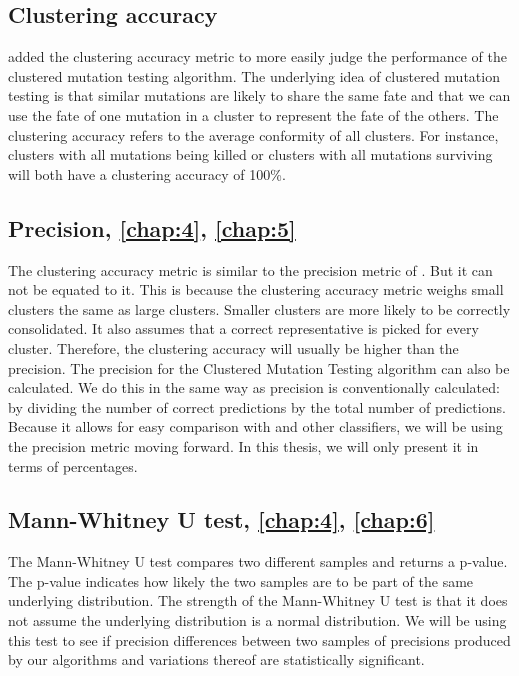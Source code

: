 \documentclass[twoside]{uva-inf-bachelor-thesis}
\begin{document}
\subsection{Clustering accuracy}
\textcite{Mouissie22} added the clustering accuracy metric to more easily judge the performance of the clustered mutation testing algorithm. The underlying idea of clustered mutation testing is that similar mutations are likely to share the same fate and that we can use the fate of one mutation in a cluster to represent the fate of the others. The clustering accuracy refers to the average conformity of all clusters. For instance, clusters with all mutations being killed or clusters with all mutations surviving will both have a clustering accuracy of 100\%.

\subsection{Precision, \textbf{\cref{chap:4}, \cref{chap:5}}}
The clustering accuracy metric is similar to the precision metric of \textcite{Zhang16}. But it can not be equated to it. This is because the clustering accuracy metric weighs small clusters the same as large clusters. Smaller clusters are more likely to be correctly consolidated. It also assumes that a correct representative is picked for every cluster. Therefore, the clustering accuracy will usually be higher than the precision. The precision for the Clustered Mutation Testing algorithm can also be calculated. We do this in the same way as precision is conventionally calculated: by dividing the number of correct predictions by the total number of predictions. Because it allows for easy comparison with \textcite{Zhang16} and other classifiers, we will be using the precision metric moving forward. In this thesis, we will only present it in terms of percentages.

\subsection{Mann-Whitney U test, \textbf{\cref{chap:4}, \cref{chap:6}}}
The Mann-Whitney U test compares two different samples and returns a p-value. The p-value indicates how likely the two samples are to be part of the same underlying distribution. The strength of the Mann-Whitney U test is that it does not assume the underlying distribution is a normal distribution. We will be using this test to see if precision differences between two samples of precisions produced by our algorithms and variations thereof are statistically significant.
\end{document}
